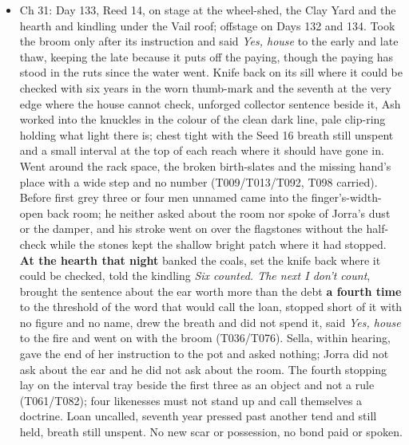 \documentclass{design/chronicle}
\begin{document}
{\begin{itemize}[leftmargin=1.4em,itemsep=1pt,topsep=3pt,parsep=0pt]
\item Ch 31: Day 133, Reed 14, on stage at the wheel-shed, the Clay Yard and the hearth and kindling under the Vail roof; offstage on Days 132 and 134. Took the broom only after its instruction and said \emph{Yes, house} to the early and late thaw, keeping the late because it puts off the paying, though the paying has stood in the ruts since the water went. Knife back on its sill where it could be checked with six years in the worn thumb-mark and the seventh at the very edge where the house cannot check, unforged collector sentence beside it, Ash worked into the knuckles in the colour of the clean dark line, pale clip-ring holding what light there is; chest tight with the Seed 16 breath still unspent and a small interval at the top of each reach where it should have gone in. Went around the rack space, the broken birth-slates and the missing hand’s place with a wide step and no number (T009/T013/T092, T098 carried). Before first grey three or four men unnamed came into the finger’s-width-open back room; he neither asked about the room nor spoke of Jorra’s dust or the damper, and his stroke went on over the flagstones without the half-check while the stones kept the shallow bright patch where it had stopped. \textbf{At the hearth that night} banked the coals, set the knife back where it could be checked, told the kindling \emph{Six counted. The next I don’t count}, brought the sentence about the ear worth more than the debt \textbf{a fourth time} to the threshold of the word that would call the loan, stopped short of it with no figure and no name, drew the breath and did not spend it, said \emph{Yes, house} to the fire and went on with the broom (T036/T076). Sella, within hearing, gave the end of her instruction to the pot and asked nothing; Jorra did not ask about the ear and he did not ask about the room. The fourth stopping lay on the interval tray beside the first three as an object and not a rule (T061/T082); four likenesses must not stand up and call themselves a doctrine. Loan uncalled, seventh year pressed past another tend and still held, breath still unspent. No new scar or possession, no bond paid or spoken.

\end{itemize}

\begin{itemize}[leftmargin=1.4em,itemsep=1pt,topsep=3pt,parsep=0pt]


\end{itemize}}
\end{document}
